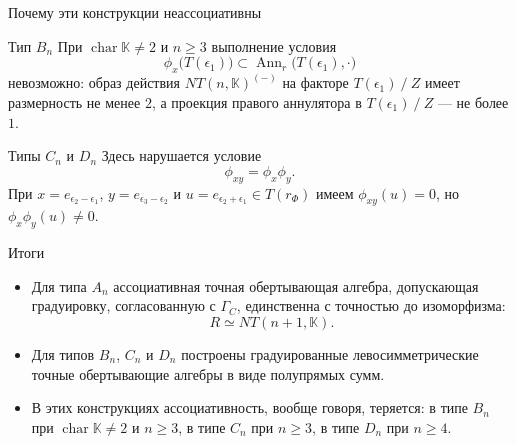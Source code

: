\documentclass[12pt,aspectratio=169]{beamer}
\DeclareMathOperator{\Ann}{Ann}
\DeclareMathOperator{\Char}{char}
\newcommand{\K}{\mathbb{K}}
\newcommand{\quot}[2]{#1\mathbin{/}#2}
\begin{document}
\begin{frame}[t]{Почему эти конструкции неассоциативны}
    \small
    \begin{block}{Тип $B_n$}
        При $\Char\K\neq 2$ и $n\ge 3$ выполнение условия
        \[
            \phi_x\bigl(T(\epsilon_1)\bigr)\subset \Ann_r\bigl(T(\epsilon_1),\cdot\bigr)
        \]
        невозможно: образ действия $NT(n,\mathbb{K})^{(-)}$ на факторе
        $\quot{T(\epsilon_1)}{Z}$ имеет размерность не менее $2$, а проекция правого
        аннулятора в $\quot{T(\epsilon_1)}{Z}$ --- не более $1$.
    \end{block}

    \begin{block}{Типы $C_n$ и $D_n$}
        Здесь нарушается условие \[\phi_{xy}=\phi_x\phi_y.\] При $x=e_{\epsilon_2 - \epsilon_1}$, $y=e_{\epsilon_3 - \epsilon_2}$ и
        $u=e_{\epsilon_2 + \epsilon_1}\in T(r_\Phi)$ имеем $\phi_{xy}(u)=0$, но $\phi_x\phi_y(u)\ne 0$.
    \end{block}
\end{frame}

\begin{frame}[t]{Итоги}
    \begin{itemize}
        \item Для типа $A_n$ ассоциативная точная обертывающая алгебра, допускающая
              градуировку, согласованную с $\Gamma_C$, единственна с точностью до
              изоморфизма:
              \[
                  R\simeq NT(n+1,\K).
              \]
        \item Для типов $B_n$, $C_n$ и $D_n$ построены градуированные левосимметрические
              точные обертывающие алгебры в виде полупрямых сумм.
        \item В этих конструкциях ассоциативность, вообще говоря, теряется: в типе $B_n$ при
              $\Char\K\neq 2$ и $n \geq 3$, в типе $C_n$ при $n\ge 3$, в типе $D_n$ при $n\ge
              4$.
    \end{itemize}
\end{frame}
\end{document}
